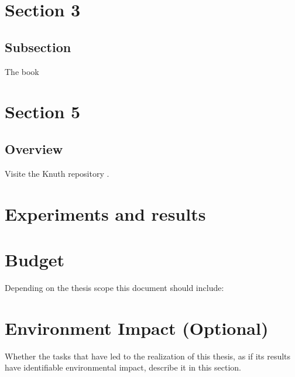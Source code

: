 \documentclass[a4paper,12pt]{article}
\begin{document}

\newpage
\section{Section 3}
\label{sec:sec3}

\lipsum[4]  \lipsum[5]
\lipsum[6]  \lipsum[7]

\subsection{Subsection}
\label{sec:subsec3.1}
The book \cite{latexcompanion} \lipsum[15]





\newpage
\section{Section 5}
\label{sec:sect5}
\lipsum[4]

\subsection{Overview}
\label{subsec:sect5Overview}
\lipsum[10]
Visite the Knuth repository \cite{knuthwebsite}.

\clearpage
\section{Experiments and results}
\label{sec:tests}
\lipsum[9]

\clearpage
\section{Budget}
{
\foreignlanguage{english}{Depending on the thesis scope this document should include:}}

\clearpage
\section[Environment Impact (Optional)]{{Environment Impact (Optional)}}

{Whether the tasks that have led to the realization of this thesis, as if its results have identifiable environmental
impact, describe it in this section.}
\end{document}
